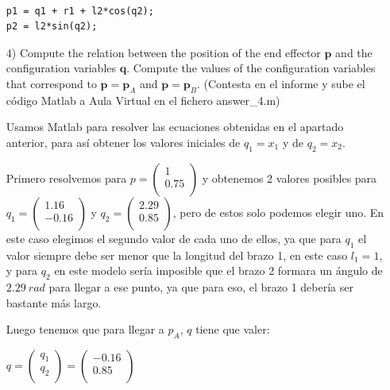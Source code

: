 \documentclass[a4paper]{article}
\begin{document}
\begin{itemize}
\bigskip

\begin{tcolorbox}[width=12cm, title={File \texttt{answer\_3.m}}]
\begin{scriptsize}
\begin{verbatim}

p1 = q1 + r1 + l2*cos(q2);
p2 = l2*sin(q2);

\end{verbatim}
\end{scriptsize}
\end{tcolorbox}


\item[4)]
 {\color{gray} Compute the relation between the position of the end effector $\mathbf{p}$ and 
the configuration variables  $\mathbf{q}$. Compute the values of the configuration variables 
that correspond to $\mathbf{p} =\mathbf{p} _A$ and $\mathbf{p} =\mathbf{p}_B$. (Contesta en el informe y sube el c\'odigo Matlab a Aula Virtual en el fichero answer\_4.m)}

\bigskip

Usamos Matlab para resolver las ecuaciones obtenidas en el apartado anterior, para así obtener los valores iniciales de $q_{1} = x_{1}$ y de $q_{2} = x_{2}$.

Primero resolvemos para $ p = \begin{pmatrix}
	1\\       
	0.75\\       
\end{pmatrix}$ y obtenemos 2 valores posibles para $q_{1} = \begin{pmatrix}
1.16\\       
-0.16\\       
\end{pmatrix}$ y $q_{2}=\begin{pmatrix}
2.29\\       
0.85\\       
\end{pmatrix}$, pero de estos solo podemos elegir uno. En este caso elegimos el segundo valor de cada uno de ellos, ya que para $q_{1}$ el valor siempre debe ser menor que la longitud del brazo 1, en este caso $l_{1} = 1$, y para $q_{2}$ en este modelo sería imposible que el brazo 2 formara un ángulo de $2.29\ rad$ para llegar a ese punto, ya que para eso, el brazo 1 debería ser bastante más largo.

Luego tenemos que para llegar a $p_{A}$, $q$ tiene que valer:

\begin{center}
	$q = \begin{pmatrix}
		q_{1}\\       
		q_{2}\\       
	\end{pmatrix} = \begin{pmatrix}
		-0.16\\       
		0.85\\       
	\end{pmatrix}$
\end{center}


\end{itemize}
\end{document}
